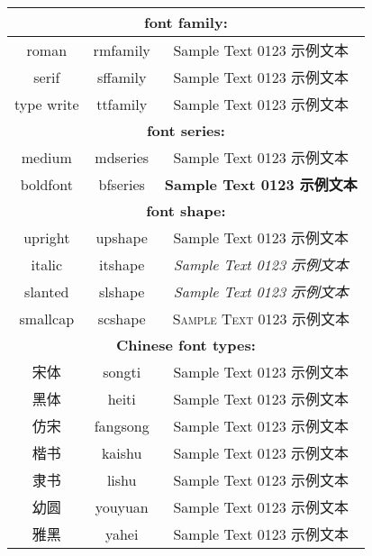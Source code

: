 \pagestyle{plain}
\fancyhf{}
\thispagestyle{empty}
\begin{center}
\begin{tabular}{|c|c|c|}
\hline
\multicolumn{3}{|c|}{\textbf{font family:}}\\\hline
roman		&	{\ttfamily {\textbackslash}rmfamily}	&	{\rmfamily	Sample Text 0123 示例文本}\\
serif		&	{\ttfamily {\textbackslash}sffamily}	&	{\sffamily	Sample Text 0123 示例文本}\\
type	write	&	{\ttfamily {\textbackslash}ttfamily}	&	{\ttfamily	Sample Text 0123 示例文本}\\
\hline
\multicolumn{3}{|c|}{\textbf{font series:}}\\\hline
medium		&	{\ttfamily {\textbackslash}mdseries}	&	{\mdseries	Sample Text 0123 示例文本}\\
boldfont		&	{\ttfamily {\textbackslash}bfseries}	&	{\bfseries	Sample Text 0123 示例文本}\\
\hline
\multicolumn{3}{|c|}{\textbf{font shape:}}\\\hline
upright		&	{\ttfamily {\textbackslash}upshape}	&	{\upshape	Sample Text 0123 示例文本}\\
italic		&	{\ttfamily {\textbackslash}itshape}	&	{\itshape	Sample Text 0123 示例文本}\\
slanted		&	{\ttfamily {\textbackslash}slshape}	&	{\slshape	Sample Text 0123 示例文本}\\
smallcap		&	{\ttfamily {\textbackslash}scshape}	&	{\scshape	Sample Text 0123 示例文本}\\
\hline
\multicolumn{3}{|c|}{\textbf{Chinese font types:}}\\\hline
宋体		&	{\ttfamily {\textbackslash}songti}	&	{\songti		Sample Text 0123 示例文本}\\
黑体		&	{\ttfamily {\textbackslash}heiti}	&	{\heiti	Sample Text 0123 示例文本}\\
仿宋		&	{\ttfamily {\textbackslash}fangsong}	&	{\fangsong		Sample Text 0123 示例文本}\\
楷书		&	{\ttfamily {\textbackslash}kaishu}	&	{\kaishu		Sample Text 0123 示例文本}\\
隶书		&	{\ttfamily {\textbackslash}lishu}	&	{\lishu		Sample Text 0123 示例文本}\\
幼圆		&	{\ttfamily {\textbackslash}youyuan}	&	{\youyuan		Sample Text 0123 示例文本}\\
雅黑		&	{\ttfamily {\textbackslash}yahei}	&	{\yahei		Sample Text 0123 示例文本}\\\hline
\end{tabular}
\end{center}
\pagebreak

\restoregeometry

